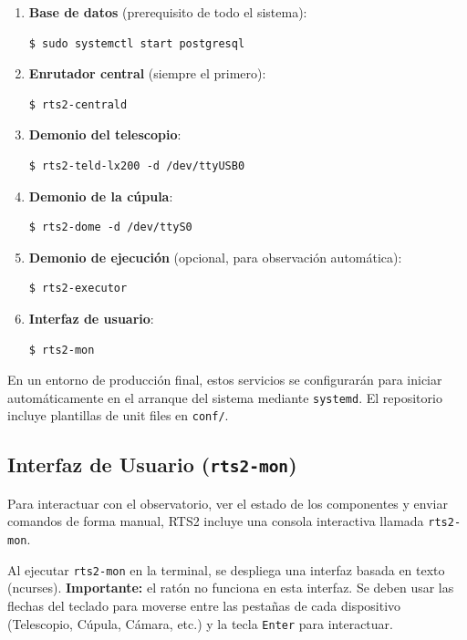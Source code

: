 \documentclass[12pt,a4paper,titlepage]{article}
\begin{document}
\begin{enumerate}
  \item \textbf{Base de datos} (prerequisito de todo el sistema):
\begin{verbatim}
$ sudo systemctl start postgresql
\end{verbatim}

  \item \textbf{Enrutador central} (siempre el primero):
\begin{verbatim}
$ rts2-centrald
\end{verbatim}

  \item \textbf{Demonio del telescopio}:
\begin{verbatim}
$ rts2-teld-lx200 -d /dev/ttyUSB0
\end{verbatim}

  \item \textbf{Demonio de la cúpula}:
\begin{verbatim}
$ rts2-dome -d /dev/ttyS0
\end{verbatim}

  \item \textbf{Demonio de ejecución} (opcional, para observación automática):
\begin{verbatim}
$ rts2-executor
\end{verbatim}

  \item \textbf{Interfaz de usuario}:
\begin{verbatim}
$ rts2-mon
\end{verbatim}
\end{enumerate}

\begin{notabox}
En un entorno de producción final, estos servicios se configurarán para iniciar automáticamente en el arranque del sistema mediante \texttt{systemd}. El repositorio incluye plantillas de unit files en \texttt{conf/}.
\end{notabox}

\subsection{Interfaz de Usuario (\texttt{rts2-mon})}

Para interactuar con el observatorio, ver el estado de los componentes y enviar comandos de forma manual, RTS2 incluye una consola interactiva llamada \texttt{rts2-mon}.

Al ejecutar \texttt{rts2-mon} en la terminal, se despliega una interfaz basada en texto (ncurses). \textbf{Importante:} el ratón no funciona en esta interfaz. Se deben usar las flechas del teclado para moverse entre las pestañas de cada dispositivo (Telescopio, Cúpula, Cámara, etc.) y la tecla \texttt{Enter} para interactuar.
\end{document}
